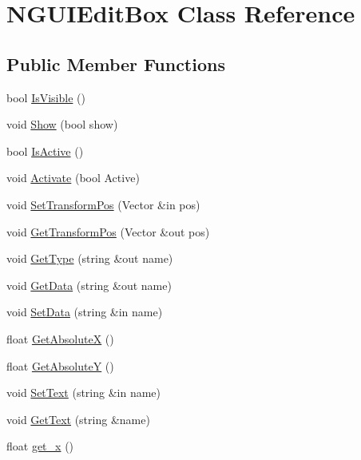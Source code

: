 \hypertarget{class_n_g_u_i_edit_box}{}\section{N\+G\+U\+I\+Edit\+Box Class Reference}
\label{class_n_g_u_i_edit_box}
\subsection*{Public Member Functions}
\begin{DoxyCompactItemize}
\item 
bool \hyperlink{class_n_g_u_i_edit_box_a33af063591321cabb4e8ea681209e0b5}{Is\+Visible} ()
\item 
void \hyperlink{class_n_g_u_i_edit_box_a317ef28f9a51fe307a0493922ebd372d}{Show} (bool show)
\item 
bool \hyperlink{class_n_g_u_i_edit_box_a2e9615371f6e892074d25ae5742c95d1}{Is\+Active} ()
\item 
void \hyperlink{class_n_g_u_i_edit_box_ad24a652c1cd47b61f1d0aa68b452f6f4}{Activate} (bool Active)
\item 
void \hyperlink{class_n_g_u_i_edit_box_a260c72df791a8fe193a77a74761ce1ea}{Set\+Transform\+Pos} (Vector \&in pos)
\item 
void \hyperlink{class_n_g_u_i_edit_box_ab7e0bd02c1f6efa8576059359f5095e5}{Get\+Transform\+Pos} (Vector \&out pos)
\item 
void \hyperlink{class_n_g_u_i_edit_box_afdf4360a5cc111188b14c9dfcec9fe91}{Get\+Type} (string \&out name)
\item 
void \hyperlink{class_n_g_u_i_edit_box_ac657e09763014ba9bf7869ab75d34c55}{Get\+Data} (string \&out name)
\item 
void \hyperlink{class_n_g_u_i_edit_box_a35bcadb3902d18d3ea2450bd76e92aa8}{Set\+Data} (string \&in name)
\item 
float \hyperlink{class_n_g_u_i_edit_box_a1ee192f04f4bfaa7df4e5c7612b58758}{Get\+AbsoluteX} ()
\item 
float \hyperlink{class_n_g_u_i_edit_box_a963e5cc3bda5a2033e143dd0a3551c7c}{Get\+AbsoluteY} ()
\item 
void \hyperlink{class_n_g_u_i_edit_box_a98927379e36a367b3727d5b5aa593a80}{Set\+Text} (string \&in name)
\item 
void \hyperlink{class_n_g_u_i_edit_box_a7049c139843b65bf1b0ecbdf30d490e9}{Get\+Text} (string \&name)
\item 
float \hyperlink{class_n_g_u_i_edit_box_aacd6f55a8832b670409ad94d55743daf}{get\+\_\+x} ()

\end{DoxyCompactItemize}
